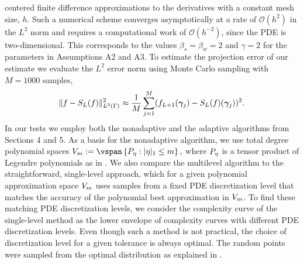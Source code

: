 centered finite difference approximations to the derivatives with a
constant mesh size, $h$. Such a numerical scheme converges
asymptotically at a rate of $\mathcal O(h^{2})$ in the $L^2$ norm
and requires a computational work of $\mathcal O(h^{-2})$, since the
PDE is two-dimensional. This corresponds to the values
$\beta_s = \beta_w = 2$ and $\gamma=2$ for the parameters in
Assumptions A2 and A3.
To estimate the projection error of our
estimate we evaluate the $L^2$ error norm using Monte Carlo sampling with $M=1000$ samples,
\begin{equation}\label{eq:l2-mc-error}
  \|f - S_L(f)\|_{L^2(\Gamma)}^2 \approx \frac{1}{M} \sum_{j=1}^M
  (f_{L+1}(\bm{\gamma}_j) - S_L(f)(\bm{\gamma}_j))^2.
\end{equation}
In our tests we employ both the nonadaptive and the adaptive
algorithms from Sections 4 and 5. As a basis for the nonadaptive
algorithm, we use total degree polynomial spaces
\(
  \vsp_{\dvsp} := \vspan\left\{ \leg_{\eta} : |\eta|_{1} \leq \dvsp \right\},
\)
where $P_\eta$ is a tensor product of Legendre
polynomials as in .  We also compare the multilevel algorithm to the
straightforward, single-level approach, which for a given polynomial
approximation space $V_{m}$ uses samples from a fixed PDE discretization
level that matches the accuracy of the polynomial best
approximation in $V_{m}$. To find these matching PDE discretization levels, we consider the complexity curve of the single-level
method as the lower envelope of complexity curves with different
PDE discretization levels. Even though such a method is not practical, the
choice of discretization level for a given tolerance is always
optimal. The random points were sampled from the optimal
distribution as explained in .

